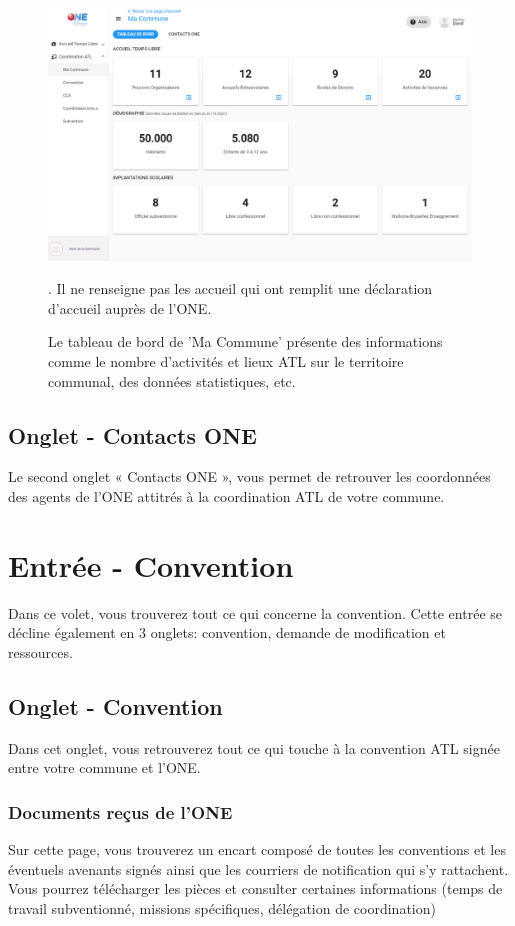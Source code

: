 \begin{figure}[htbp]
    \centering
    \includegraphics[width=12cm]{Images/catl/Ma Commune.png}
    \caption{Le tableau de bord de 'Ma Commune' présente des informations comme le nombre d'activités et lieux ATL sur le territoire communal, des données statistiques, etc.}. Il ne renseigne pas les accueil qui ont remplit une déclaration d'accueil auprès de l'ONE.
    \label{fig:ma_commune}
\end{figure}




\subsection{Onglet - Contacts ONE}
Le second onglet « Contacts ONE », vous permet de retrouver les coordonnées des agents de l’ONE attitrés à la coordination ATL de votre commune. 



\section{Entrée - Convention}
Dans ce volet, vous trouverez tout ce qui concerne la convention. Cette entrée se décline également en 3 onglets: convention, demande de modification et ressources.



\subsection{Onglet - Convention}
Dans cet onglet, vous retrouverez tout ce qui touche à la convention ATL signée entre votre commune et l’ONE.

\subsubsection{Documents reçus de l'ONE}
 Sur cette page, vous trouverez un encart composé de toutes les conventions et les éventuels avenants signés ainsi que les courriers de notification qui s’y rattachent. Vous pourrez télécharger les pièces et consulter certaines informations (temps de travail subventionné, missions spécifiques, délégation de coordination)

